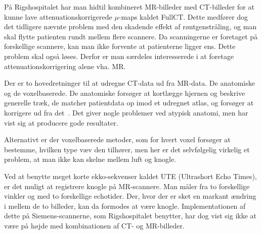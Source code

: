 På Rigshospitalet har man hidtil kombineret MR-billeder med CT-billeder
for at kunne lave attenuationskorrigerede $\mu$-maps kaldet FullCT.
Dette medfører dog det tidligere nævnte problem med den skadende
effekt af røntgenstråling, og man skal flytte patienten rundt mellem
flere scannere. Da scanningerne er foretaget på forskellige scannere,
kan man ikke forvente at patienterne ligger ens. Dette problem skal
også løses. Derfor er man særdeles interesserede i at foretage
attenuationskorrigering alene vha. MR.

Der er to hovedretninger til at udregne CT-data ud fra MR-data. De
anatomiske og de voxelbaserede. De anatomiske forsøger at kortlægge
hjernen og beskrive generelle træk, de matcher patientdata op imod
et udregnet atlas, og forsøger at korrigere ud fra det~\cite{atlas1,
atlas2}. Det giver nogle problemer ved atypisk anatomi, men har vist sig
at producere gode resultater.

Alternativt er der voxelbaserede metoder, som for hvert voxel forsøger
at bestemme, hvilken type væv den tilhører, men her er det selvfølgelig
virkelig et problem, at man ikke kan skelne mellem luft og knogle.

Ved at benytte meget korte ekko-sekvenser kaldet UTE (Ultrashort Echo
Times), er det muligt at registrere knogle på MR-scannere. Man måler fra
to forskellige vinkler og med to forskellige echotider. Der, hvor der er
sket en markant ændring i mellem de to billeder, kan da formodes at være
knogle. Implementationen af dette på Siemens-scannerne, som Rigshospitalet
benytter, har dog vist sig ikke at være på højde med kombinationen af
CT- og MR-billeder.


